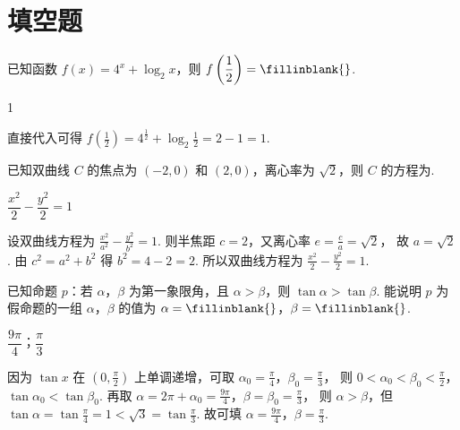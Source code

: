 \section{填空题}

\begin{problem}
已知函数 \(f(x)=4^x+\log_2 x\)，则 \(f\left(\dfrac{1}{2}\right)=\fillinblank{}\).
\end{problem}

\begin{answer}
1
\end{answer}

\begin{solution}
直接代入可得
\(f\left(\frac{1}{2}\right)=4^{\frac{1}{2}}+\log_2 \frac{1}{2}=2-1=1\).
\end{solution}

\begin{problem}
已知双曲线 \(C\) 的焦点为 \((-2,0)\) 和 \((2,0)\)，离心率为 \(\sqrt{2}\)，则 \(C\) 的方程为\fillinblank{}.
\end{problem}

\begin{answer}
\(\dfrac{x^2}{2}-\dfrac{y^2}{2}=1\)
\end{answer}

\begin{solution}
设双曲线方程为
\(\frac{x^2}{a^2}-\frac{y^2}{b^2}=1\).
则半焦距 \(c=2\)，又离心率
\(e=\frac{c}{a}=\sqrt{2}\)，
故
\(a=\sqrt{2}\).
由
\(c^2=a^2+b^2\)
得
\(b^2=4-2=2\).
所以双曲线方程为
\(\frac{x^2}{2}-\frac{y^2}{2}=1\).
\end{solution}

\begin{problem}
已知命题 \(p\)：若 \(\alpha\)，\(\beta\) 为第一象限角，且 \(\alpha>\beta\)，则 \(\tan\alpha>\tan\beta\). 能说明 \(p\) 为假命题的一组 \(\alpha\)，\(\beta\) 的值为 \(\alpha=\fillinblank{}\)，\(\beta=\fillinblank{}\).
\end{problem}

\begin{answer}
\(\dfrac{9\pi}{4}\)；\(\dfrac{\pi}{3}\)
\end{answer}

\begin{solution}
因为 \(\tan x\) 在 \(\left(0,\frac{\pi}{2}\right)\) 上单调递增，可取
\(\alpha_0=\frac{\pi}{4}\)，\(\beta_0=\frac{\pi}{3}\)，
则
\(0<\alpha_0<\beta_0<\frac{\pi}{2}\)，\(\tan\alpha_0<\tan\beta_0\).
再取
\(\alpha=2\pi+\alpha_0=\frac{9\pi}{4}\)，\(\beta=\beta_0=\frac{\pi}{3}\)，
则 \(\alpha>\beta\)，但
\(\tan\alpha=\tan\frac{\pi}{4}=1<\sqrt{3}=\tan\frac{\pi}{3}\).
故可填
\(\alpha=\frac{9\pi}{4}\)，\(\beta=\frac{\pi}{3}\).
\end{solution}

